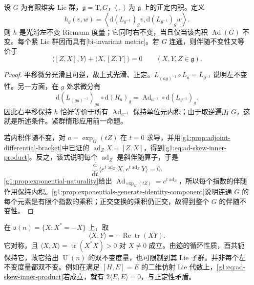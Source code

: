 \begin{proposition}\label{g1:prop:bi-invariant-metric}
	设 \(G\) 为有限维实 Lie 群，\(\mathfrak g=\mathrm{T}_eG\)，\(\langle\ ,\ \rangle\) 为 \(\mathfrak g\) 上的正定内积。定义
	\[
		h_g(v,w)=\left\langle\mathrm{d}(L_{g^{-1}})_gv,
		\mathrm{d}(L_{g^{-1}})_gw\right\rangle.
	\]
	则 \(h\) 是光滑左不变 Riemann 度量；它同时右不变，当且仅当该内积 \(\operatorname{Ad}(G)\) 不变。每个紧 Lie 群因而具有[bi-invariant metric]。若 \(G\) 连通，则伴随不变性又等价于
	\begin{equation}\label{g1:eq:ad-skew-inner-product}
		\langle[Z,X],Y\rangle+\langle X,[Z,Y]\rangle=0
		\qquad(X,Y,Z\in\mathfrak g).
	\end{equation}
\end{proposition}
\begin{proof}
	平移微分光滑且可逆，故上式光滑、正定。\(L_{(ag)^{-1}}\circ L_a=L_{g^{-1}}\) 说明左不变性。另一方面，在 \(g\) 处求微分有
	\[
		\mathrm{d}(L_{(ga)^{-1}})_{ga}\circ\mathrm{d}(R_a)_g
		=\operatorname{Ad}_{a^{-1}}\circ\mathrm{d}(L_{g^{-1}})_g.
	\]
	因此右平移保持 \(h\) 恰好等价于所有 \(\operatorname{Ad}_{a^{-1}}\) 保持单位元内积；由于取逆遍历 \(G\)，这就是所述条件。紧群情形应用前一命题。

	若内积伴随不变，对 \(a=\exp_G(tZ)\) 在 \(t=0\) 求导，并用\cref{g1:prop:adjoint-differential-bracket}中已证的 \(\operatorname{ad}_ZX=[Z,X]\)，得到\eqref{g1:eq:ad-skew-inner-product}。反之，该式说明每个 \(\operatorname{ad}_Z\) 是斜伴随算子，于是
	\[
		\frac{\mathrm{d}}{\mathrm{d}t}
		\langle e^{t\operatorname{ad}_Z}X,e^{t\operatorname{ad}_Z}Y\rangle=0.
	\]
	\cref{g1:prop:exponential-naturality}给出 \(\operatorname{Ad}_{\exp_G(tZ)}=e^{t\operatorname{ad}_Z}\)，所以每个指数的伴随作用保持内积。\cref{g1:prop:exponentials-generate-identity-component}说明连通 \(G\) 的每个元素是有限个指数的乘积；正交变换的乘积仍正交，故得到整个 \(G\) 的伴随不变性。
\end{proof}

\begin{example}\label{g1:exm:unitary-trace-metric}
	在 \(\mathfrak u(n)=\{X:X^*=-X\}\) 上，取
	\[
		\langle X,Y\rangle=-\operatorname{Re}\operatorname{tr}(XY).
	\]
	它对称，且 \(\langle X,X\rangle=\operatorname{tr}(X^*X)>0\) 对 \(X\ne0\) 成立。由迹的循环性质，酉共轭保持它，故它给出 \(\operatorname{U}(n)\) 的双不变度量，也可限制到其 Lie 子群。并非每个左不变度量都双不变。例如在满足 \([H,E]=E\) 的二维仿射 Lie 代数上，\eqref{g1:eq:ad-skew-inner-product}若成立，就有 \(2\langle E,E\rangle=0\)，与正定性矛盾。
\end{example}

